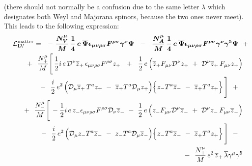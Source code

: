 \documentclass[12pt]{revtex4}
\newcommand{\slashed}[1]{\hbox{{$#1$}\llap{$/$}}}
\begin{document}
(there should not normally be a confusion due to the
same letter $ \lambda $ which designates both Weyl
and Majorana spinors, because the two ones never meet).
This leads to the following expression:
\begin{eqnarray}
\nonumber
\lefteqn{
     \mathcal{L}_{\mathrm{LV}}^{\mathrm{matter}}  = 
~~      %
-~
\boldsymbol{
\frac{N_V^\mu}{M}\,
\frac{1}{4} \,e\,
\overline{\Psi} \epsilon_{\mu\nu\rho\sigma}
F^{\rho\sigma} \gamma^\nu \Psi 
     }
~~-~~
\boldsymbol{
\frac{N_A^\mu}{M}\,
\frac{1}{4} \,e\,
\overline{\Psi} \epsilon_{\mu\nu\rho\sigma}
F^{\rho\sigma} \gamma^\nu \gamma^5 \Psi 
     }
~~+~~ 
}\\
\nonumber
&&
~~+~~
\frac{N_+^\mu}{M}
\Bigg[\,
\frac{1}{2}i \,e \, 
\mathcal{D}^\nu \overline{z}_+ \,
\epsilon_{\mu\nu\rho\sigma}F^{\rho\sigma} z_+ 
~~+~~
\frac{1}{2}\, e\,
\Big(
  \overline{z}_+ F_{\mu\nu}
  \mathcal{D}^\nu z_+ 
  ~+~
  \mathcal{D}^\nu \overline{z}_+ \,
  F_{\mu\nu} z_+
\Big) 
\\
\nonumber
&&
               \qquad
~~-~~
\frac{i}{2}\, e^2\,
\Big(
  \mathcal{D}_\mu \overline{z}_+ \,
  T^a z_+ 
  ~-~
  \overline{z}_+ T^a \mathcal{D}_\mu z_+
\Big)
\Big\{
  z_- T^a \overline{z}_- 
  ~-~
  \overline{z}_+ T^a z_+
\Big\}
\,\Bigg] ~~+~~ \\
\nonumber
&&
~~+~~
\frac{N_-^\mu}{M}
\Bigg[\,
- \frac{1}{2} i\, e\,
z_- \epsilon_{\mu\nu\rho\sigma}F^{\rho\sigma}
\mathcal{D}_\nu \overline{z}_- 
~-~
\frac{1}{2}\, e\,
\Big(
  z_- F_{\mu\nu}\mathcal{D}^\nu \overline{z}_- 
  ~+~
  \mathcal{D}^\nu z_- \,
  F_{\mu\nu} \overline{z}_- 
\Big)
\\
\nonumber
&&
               \qquad
~~-~~ 
\frac{i}{2}\, e^2\,
\Big(
  \mathcal{D}_\mu z_- T^a \overline{z}_-
  ~-~
  z_- T^a \mathcal{D}_\mu \overline{z}_-
\Big)
\Big\{
  z_- T^a \overline{z}_- 
  ~-~
  \overline{z}_+ T^a z_+
\Big\}
\,\Bigg]
~~-~~ \\
\nonumber
&&
~~-~~
\frac{N_+^\mu}{M}\, e^2\,
\overline{z}_+ \, \overline{\lambda} \gamma^\mu \gamma^5 

\end{eqnarray}
\end{document}
